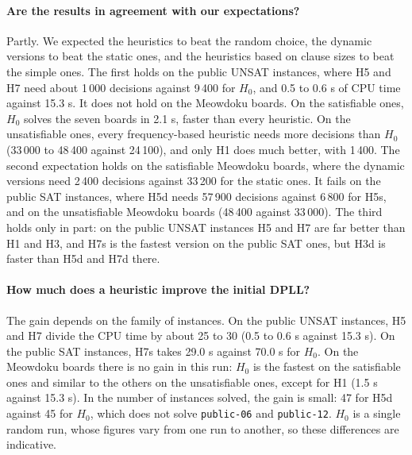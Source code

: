 \paragraph{Are the results in agreement with our expectations?} Partly. We expected the heuristics to beat the random choice, the dynamic versions to beat the static ones, and the heuristics based on clause sizes to beat the simple ones. The first holds on the public UNSAT instances, where H5 and H7 need about 1\,000 decisions against 9\,400 for $H_0$, and 0.5 to 0.6 s of CPU time against 15.3 s. It does not hold on the Meowdoku boards. On the satisfiable ones, $H_0$ solves the seven boards in 2.1 s, faster than every heuristic. On the unsatisfiable ones, every frequency-based heuristic needs more decisions than $H_0$ (33\,000 to 48\,400 against 24\,100), and only H1 does much better, with 1\,400. The second expectation holds on the satisfiable Meowdoku boards, where the dynamic versions need 2\,400 decisions against 33\,200 for the static ones. It fails on the public SAT instances, where H5d needs 57\,900 decisions against 6\,800 for H5s, and on the unsatisfiable Meowdoku boards (48\,400 against 33\,000). The third holds only in part: on the public UNSAT instances H5 and H7 are far better than H1 and H3, and H7s is the fastest version on the public SAT ones, but H3d is faster than H5d and H7d there.

\paragraph{How much does a heuristic improve the initial DPLL?} The gain depends on the family of instances. On the public UNSAT instances, H5 and H7 divide the CPU time by about 25 to 30 (0.5 to 0.6 s against 15.3 s). On the public SAT instances, H7s takes 29.0 s against 70.0 s for $H_0$. On the Meowdoku boards there is no gain in this run: $H_0$ is the fastest on the satisfiable ones and similar to the others on the unsatisfiable ones, except for H1 (1.5 s against 15.3 s). In the number of instances solved, the gain is small: 47 for H5d against 45 for $H_0$, which does not solve \texttt{public-06} and \texttt{public-12}. $H_0$ is a single random run, whose figures vary from one run to another, so these differences are indicative.

